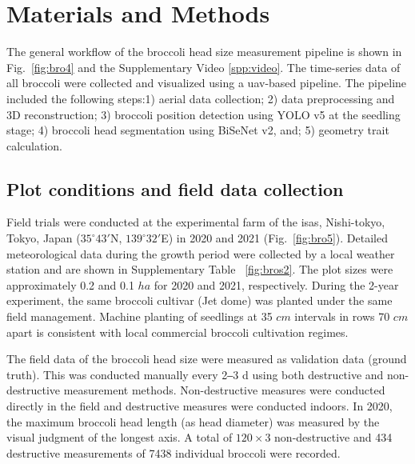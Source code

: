 \section{Materials and Methods}

The general workflow of the broccoli head size measurement pipeline is shown in Fig.~\ref{fig:bro4} and the Supplementary Video \ref{spp:video}. The time-series data of all broccoli were collected and visualized using a \gls{uav}-based pipeline. The pipeline included the following steps:1) aerial data collection; 2) data preprocessing and 3D reconstruction; 3) broccoli position detection using YOLO v5 at the seedling stage; 4) broccoli head segmentation using BiSeNet v2, and; 5) geometry trait calculation. 




\subsection{Plot conditions and field data collection}

Field trials were conducted at the experimental farm of the \gls{isas}, Nishi-tokyo, Tokyo, Japan ($35^\circ 43'$N, $139^\circ 32'$E) in 2020 and 2021 (Fig.~\ref{fig:bro5}). Detailed meteorological data during the growth period were collected by a local weather station and are shown in Supplementary Table ~\ref{fig:bros2}. The plot sizes were approximately 0.2 and 0.1 $ha$ for 2020 and 2021, respectively. During the 2-year experiment, the same broccoli cultivar (Jet dome) was planted under the same field management. Machine planting of seedlings at 35 $cm$ intervals in rows 70 $cm$ apart is consistent with local commercial broccoli cultivation regimes. 



The field data of the broccoli head size were measured as validation data (ground truth). This was conducted manually every 2‒3 d using both destructive and non-destructive measurement methods. Non-destructive measures were conducted directly in the field and destructive measures were conducted indoors. In 2020, the maximum broccoli head length (as head diameter) was measured by the visual judgment of the longest axis. A total of $120 \times 3$ non-destructive and 434 destructive measurements of 7438 individual broccoli were recorded. 

